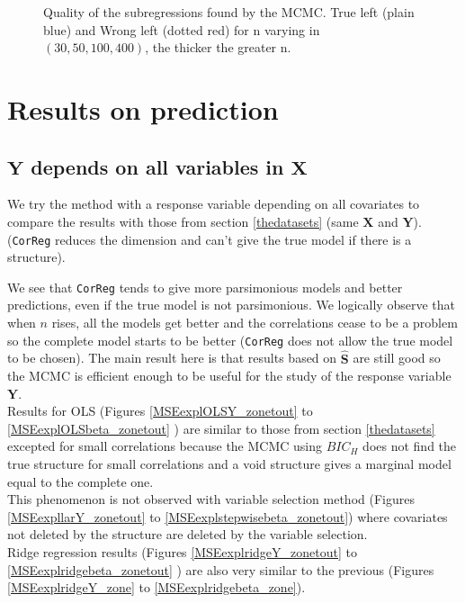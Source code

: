 \documentclass[12pt,a4paper]{report}
\begin{document}
\begin{figure}[h!]
	 \quad
	\caption{Quality of the subregressions found by the MCMC. True left (plain blue) and Wrong left (dotted red) for n varying in $(30,50,100,400)$, the thicker the greater n.}\label{compZBIC}
\end{figure}




\clearpage
\section{Results on prediction}\label{compY}
\subsection{$\boldsymbol{Y}$ depends on all variables in $\boldsymbol{X}$}	 \label{explsimtout}	
We try the method with a response variable depending on all covariates to compare the results with those from section \ref{thedatasets} (same $\boldsymbol{X}$ and $\boldsymbol{Y}$). ({\tt CorReg} reduces the dimension and can't give the true model if there is a structure). %

 We see that {\tt CorReg} tends to give more parsimonious models and better predictions, even if the true model is not parsimonious. We logically observe that when $n$ rises, all the models get better and the correlations cease to be a problem so the complete model starts to be better ({\tt CorReg} does not allow the true model to be chosen). The main result here is that results based on $\hat{\boldsymbol{S}}$ are still good so the MCMC is efficient enough to be useful for the study of the response variable $\boldsymbol{Y}$. \\
 
 Results for OLS (Figures \ref{MSEexplOLSY_zonetout} to \ref{MSEexplOLSbeta_zonetout} ) are similar to those from section \ref{thedatasets} excepted for small correlations because the MCMC using $BIC_H$ does not find the true structure for small correlations and a void structure gives a marginal model equal to the complete one.  \\
 This phenomenon is not observed with variable selection method (Figures \ref{MSEexpllarY_zonetout} to \ref{MSEexplstepwisebeta_zonetout}) where covariates not deleted by the structure are deleted by the variable selection. \\
 Ridge regression results (Figures \ref{MSEexplridgeY_zonetout} to \ref{MSEexplridgebeta_zonetout} ) are also very similar to the previous (Figures \ref{MSEexplridgeY_zone} to \ref{MSEexplridgebeta_zone}).\\
 
\end{document}
